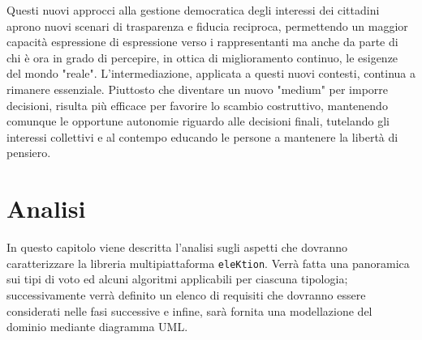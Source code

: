 \documentclass[12pt,a4paper,openright,twoside]{book}
\begin{document}
Questi nuovi approcci alla gestione democratica degli interessi dei cittadini aprono nuovi
scenari di trasparenza e fiducia reciproca, permettendo un maggior capacità espressione di espressione
verso i rappresentanti ma anche da parte di chi è ora in grado di percepire, in ottica di miglioramento continuo,
le esigenze del mondo "reale". 
L'intermediazione, applicata a questi nuovi contesti, continua a rimanere essenziale.
Piuttosto che diventare un nuovo "medium" per imporre decisioni, risulta più efficace per
favorire lo scambio costruttivo, mantenendo comunque le opportune autonomie riguardo alle
decisioni finali, tutelando gli interessi collettivi e al contempo educando le persone a mantenere
la libertà di pensiero\cite{castelfranchi2019problematic}.


\chapter{Analisi}
In questo capitolo viene descritta l'analisi sugli aspetti che dovranno 
caratterizzare la libreria multipiattaforma \texttt{eleKtion}. Verrà fatta una panoramica sui tipi di voto
ed alcuni algoritmi applicabili per ciascuna tipologia; successivamente verrà definito un 
elenco di requisiti che dovranno essere considerati nelle fasi successive e infine,
sarà fornita una modellazione del dominio mediante diagramma UML.
\end{document}
